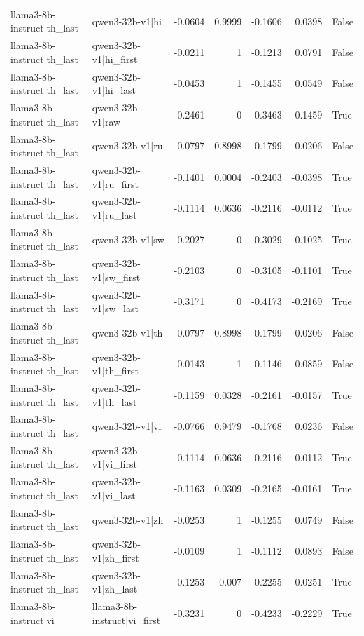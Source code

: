 \begin{table}
\begin{tabular}{l l r r r r l}
llama3-8b-instruct|th_last & qwen3-32b-v1|hi & -0.0604 & 0.9999 & -0.1606 & 0.0398 & False \\
llama3-8b-instruct|th_last & qwen3-32b-v1|hi_first & -0.0211 & 1 & -0.1213 & 0.0791 & False \\
llama3-8b-instruct|th_last & qwen3-32b-v1|hi_last & -0.0453 & 1 & -0.1455 & 0.0549 & False \\
llama3-8b-instruct|th_last & qwen3-32b-v1|raw & -0.2461 & 0 & -0.3463 & -0.1459 & True \\
llama3-8b-instruct|th_last & qwen3-32b-v1|ru & -0.0797 & 0.8998 & -0.1799 & 0.0206 & False \\
llama3-8b-instruct|th_last & qwen3-32b-v1|ru_first & -0.1401 & 0.0004 & -0.2403 & -0.0398 & True \\
llama3-8b-instruct|th_last & qwen3-32b-v1|ru_last & -0.1114 & 0.0636 & -0.2116 & -0.0112 & True \\
llama3-8b-instruct|th_last & qwen3-32b-v1|sw & -0.2027 & 0 & -0.3029 & -0.1025 & True \\
llama3-8b-instruct|th_last & qwen3-32b-v1|sw_first & -0.2103 & 0 & -0.3105 & -0.1101 & True \\
llama3-8b-instruct|th_last & qwen3-32b-v1|sw_last & -0.3171 & 0 & -0.4173 & -0.2169 & True \\
llama3-8b-instruct|th_last & qwen3-32b-v1|th & -0.0797 & 0.8998 & -0.1799 & 0.0206 & False \\
llama3-8b-instruct|th_last & qwen3-32b-v1|th_first & -0.0143 & 1 & -0.1146 & 0.0859 & False \\
llama3-8b-instruct|th_last & qwen3-32b-v1|th_last & -0.1159 & 0.0328 & -0.2161 & -0.0157 & True \\
llama3-8b-instruct|th_last & qwen3-32b-v1|vi & -0.0766 & 0.9479 & -0.1768 & 0.0236 & False \\
llama3-8b-instruct|th_last & qwen3-32b-v1|vi_first & -0.1114 & 0.0636 & -0.2116 & -0.0112 & True \\
llama3-8b-instruct|th_last & qwen3-32b-v1|vi_last & -0.1163 & 0.0309 & -0.2165 & -0.0161 & True \\
llama3-8b-instruct|th_last & qwen3-32b-v1|zh & -0.0253 & 1 & -0.1255 & 0.0749 & False \\
llama3-8b-instruct|th_last & qwen3-32b-v1|zh_first & -0.0109 & 1 & -0.1112 & 0.0893 & False \\
llama3-8b-instruct|th_last & qwen3-32b-v1|zh_last & -0.1253 & 0.007 & -0.2255 & -0.0251 & True \\
llama3-8b-instruct|vi & llama3-8b-instruct|vi_first & -0.3231 & 0 & -0.4233 & -0.2229 & True \\

\end{tabular}
\end{table}
